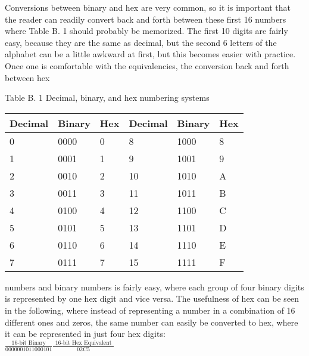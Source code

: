 \documentclass[10pt]{article}
\begin{document}
Conversions between binary and hex are very common, so it is important that the reader can readily convert back and forth between these first 16 numbers where Table B. 1 should probably be memorized. The first 10 digits are fairly easy, because they are the same as decimal, but the second 6 letters of the alphabet can be a little awkward at first, but this becomes easier with practice. Once one is comfortable with the equivalencies, the conversion back and forth between hex

Table B. 1 Decimal, binary, and hex numbering systems

\begin{center}
\begin{tabular}{|l|l|l|l|l|l|}
\hline
Decimal & Binary & Hex & Decimal & Binary & Hex \\
\hline
0 & 0000 & 0 & 8 & 1000 & 8 \\
\hline
1 & 0001 & 1 & 9 & 1001 & 9 \\
\hline
2 & 0010 & 2 & 10 & 1010 & A \\
\hline
3 & 0011 & 3 & 11 & 1011 & B \\
\hline
4 & 0100 & 4 & 12 & 1100 & C \\
\hline
5 & 0101 & 5 & 13 & 1101 & D \\
\hline
6 & 0110 & 6 & 14 & 1110 & E \\
\hline
7 & 0111 & 7 & 15 & 1111 & F \\
\hline
\end{tabular}
\end{center}

numbers and binary numbers is fairly easy, where each group of four binary digits is represented by one hex digit and vice versa. The usefulness of hex can be seen in the following, where instead of representing a number in a combination of 16 different ones and zeros, the same number can easily be converted to hex, where it can be represented in just four hex digits:\\
$\frac{\text { 16-bit Binary }}{0000001011000101} \frac{\text { 16-bit Hex Equivalent }}{02 \mathrm{C} 5}$
\end{document}
